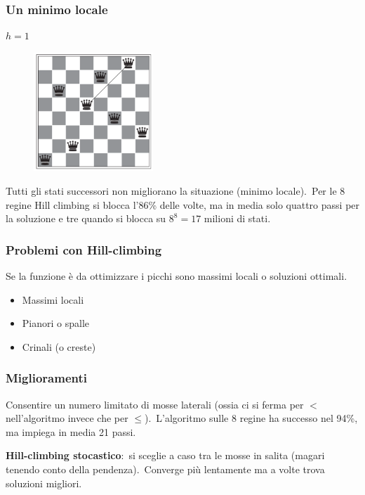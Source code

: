 \subsubsection{Un minimo locale}

$h = 1$
\begin{figure}[H]
	\centering
	\includegraphics[width=0.4\textwidth]{immagini/minimo_locale.png}
\end{figure}

\noindent Tutti gli stati successori non migliorano la situazione (minimo locale).\
Per le 8 regine Hill climbing si blocca l'86\% delle volte, ma in media solo quattro passi per la soluzione e tre quando si blocca su $8^8 = 17$ milioni di stati.

\subsubsection{Problemi con Hill-climbing}

Se la funzione è da ottimizzare i picchi sono massimi locali o soluzioni ottimali.\

\begin{itemize}
	\item Massimi locali
	\item Pianori o spalle
	\item Crinali (o creste)
\end{itemize}

\subsubsection{Miglioramenti}
Consentire un numero limitato di mosse laterali (ossia ci si ferma per $<$ nell'algoritmo invece che per $\leq$).\
L'algoritmo sulle 8 regine ha successo nel 94\%, ma impiega in media 21 passi.\

\textbf{Hill-climbing stocastico}:\ si sceglie a caso tra le mosse in salita (magari tenendo conto della pendenza).\
Converge più lentamente ma a volte trova soluzioni migliori.\

